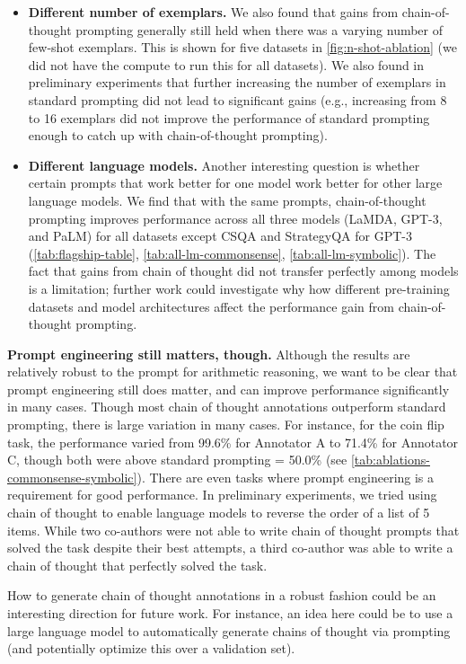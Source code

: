 \documentclass[]{article}
\theoremstyle{plain}
\theoremstyle{definition}
\theoremstyle{remark}
\newcommand{\lamda}[0]{LaMDA}
\newcommand{\palm}[0]{PaLM}
\begin{document}
\begin{itemize}[leftmargin=*]
    \item \textbf{Different number of exemplars.} We also found that gains from chain-of-thought prompting generally still held when there was a varying number of few-shot exemplars. This is shown for five datasets in \cref{fig:n-shot-ablation} (we did not have the compute to run this for all datasets). We also found in preliminary experiments that further increasing the number of exemplars in standard prompting did not lead to significant gains (e.g., increasing from 8 to 16 exemplars did not improve the performance of standard prompting enough to catch up with chain-of-thought prompting).
    \item \textbf{Different language models.} Another interesting question is whether certain prompts that work better for one model work better for other large language models. We find that with the same prompts, chain-of-thought prompting improves performance across all three models (\lamda{}, GPT-3, and \palm{}) for all datasets except CSQA and StrategyQA for GPT-3 (\cref{tab:flagship-table}, \cref{tab:all-lm-commonsense}, \cref{tab:all-lm-symbolic}). The fact that gains from chain of thought did not transfer perfectly among models is a limitation; further work could investigate why how different pre-training datasets and model architectures affect the performance gain from chain-of-thought prompting.
\end{itemize}

\textbf{Prompt engineering still matters, though.} Although the results are relatively robust to the prompt for arithmetic reasoning, we want to be clear that prompt engineering still does matter, and can improve performance significantly in many cases.
Though most chain of thought annotations outperform standard prompting, there is large variation in many cases.
For instance, for the coin flip task, the performance varied from 99.6\% for Annotator A to 71.4\% for Annotator C, though both were above standard prompting = 50.0\% (see \cref{tab:ablations-commonsense-symbolic}).
There are even tasks where prompt engineering is a requirement for good performance. 
In preliminary experiments, we tried using chain of thought to enable language models to reverse the order of a list of 5 items.
While two co-authors were not able to write chain of thought prompts that solved the task despite their best attempts, a third co-author was able to write a chain of thought that perfectly solved the task.

How to generate chain of thought annotations in a robust fashion could be an interesting direction for future work.
For instance, an idea here could be to use a large language model to automatically generate chains of thought via prompting (and potentially optimize this over a validation set).
\end{document}
